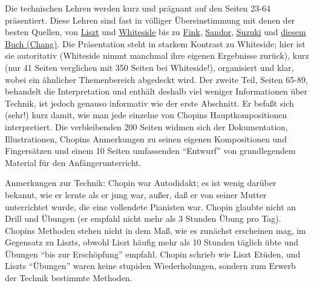 Die technischen Lehren werden kurz und prägnant auf den Seiten 23-64 präsentiert.
Diese Lehren sind fast in völliger Übereinstimmung mit denen der besten Quellen, von \hyperref[Walker]{Liszt} und \hyperref[Whiteside]{Whiteside} bis zu \hyperref[Fink]{Fink}, \hyperref[Sandor]{Sandor}, \hyperref[Suzuki]{Suzuki} und \hyperref[Chang]{diesem Buch (Chang)}.
Die Präsentation steht in starkem Kontrast zu Whiteside; hier ist sie autoritativ (Whiteside nimmt manchmal ihre eigenen Ergebnisse zurück), kurz (nur 41 Seiten verglichen mit 350 Seiten bei Whiteside!), organisiert und klar, wobei ein ähnlicher Themenbereich abgedeckt wird.
Der zweite Teil, Seiten 65-89, behandelt die Interpretation und enthält deshalb viel weniger Informationen über Technik, ist jedoch genauso informativ wie der erste Abschnitt.
Er befaßt sich (sehr!) kurz damit, wie man jede einzelne von Chopins Hauptkompositionen interpretiert.
Die verbleibenden 200 Seiten widmen sich der Dokumentation, Illustrationen, Chopins Anmerkungen zu seinen eigenen Kompositionen und Fingersätzen und einem 10 Seiten umfassenden \enquote{Entwurf} von grundlegendem Material für den Anfängerunterricht.

Anmerkungen zur Technik: Chopin war Autodidakt; es ist wenig darüber bekannt, wie er lernte als er jung war, außer, daß er von seiner Mutter unterrichtet wurde, die eine vollendete Pianisten war.
Chopin glaubte nicht an Drill und Übungen (er empfahl nicht mehr als 3 Stunden Übung pro Tag).
Chopins Methoden stehen nicht in dem Maß, wie es zunächst erscheinen mag, im Gegensatz zu Liszts, obwohl Liszt häufig mehr als 10 Stunden täglich übte und Übungen \enquote{bis zur Erschöpfung} empfahl.
Chopin schrieb wie Liszt Etüden, und Liszts \enquote{Übungen} waren keine stupiden Wiederholungen, sondern zum Erwerb der Technik bestimmte Methoden.

